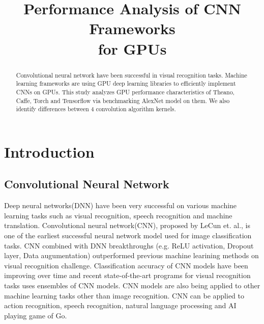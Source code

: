 \documentclass[conference]{IEEEtran}
\begin{document}
\title{Performance Analysis of CNN Frameworks\\for GPUs}

\author{
\and
{}
}

\maketitle

\begin{abstract}
Convolutional neural network have been successful in visual recognition tasks.
Machine learning frameworks are using GPU deep learning libraries to efficiently implement CNNs on GPUs.
This study analyzes GPU performance characteristics of Theano, Caffe, Torch and Tensorflow via benchmarking AlexNet model on them.
We also identify differences between 4 convolution algorithm kernels.

\end{abstract}

\IEEEpeerreviewmaketitle

\section{Introduction}

\subsection{Convolutional Neural Network}
Deep neural networks(DNN) have been very successful on various machine learning tasks such as visual recognition, speech recognition and machine translation.
\cite{}%
Convolutional neural network(CNN), proposed by LeCun et. al., is one of the earliest successful neural network model used for image classification tasks.
\cite{}%
CNN combined with DNN breakthroughs (e.g. ReLU activation, Dropout layer, Data augumentation) outperformed previous machine learining methods on visual recognition challenge.
\cite{}%
Classification accuracy of CNN models have been improving over time and recent state-of-the-art programs for visual recognition tasks uses ensembles of CNN models.
\cite{}%
CNN models are also being applied to other machine learning tasks other than image recognition. CNN can be applied to action recognition, speech recognition, natural language processing and AI playing game of Go.
\cite{}%
\end{document}
